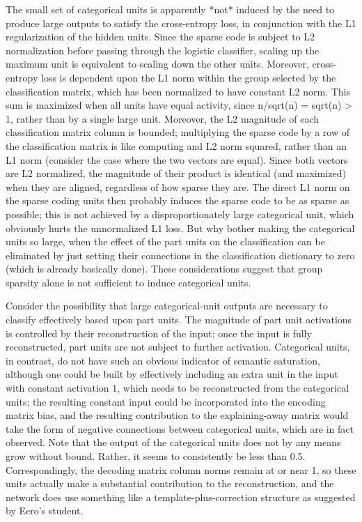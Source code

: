 The small set of categorical units is apparently *not* induced by the need to produce large outputs to satisfy the cross-entropy loss, in conjunction with the L1 regularization of the hidden units.  Since the sparse code is subject to L2 normalization before passing through the logistic classifier, scaling up the maximum unit is equivalent to scaling down the other units.  Moreover, cross-entropy loss is dependent upon the L1 norm within the group selected by the classification matrix, which has been normalized to have constant L2 norm.  This sum is maximized when all units have equal activity, since n/sqrt(n) = sqrt(n) > 1, rather than by a single large unit.  Moreover, the L2 magnitude of each classification matrix column is bounded; multiplying the sparse code by a row of the classification matrix is like computing and L2 norm squared, rather than an L1 norm (consider the case where the two vectors are equal).  Since both vectors are L2 normalized, the magnitude of their product is identical (and maximized) when they are aligned, regardless of how sparse they are.  The direct L1 norm on the sparse coding units then probably induces the sparse code to be as sparse as possible; this is not achieved by a disproportionately large categorical unit, which obviously hurts the unnormalized L1 loss.  But why bother making the categorical units so large, when the effect of the part units on the classification can be eliminated by just setting their connections in the classification dictionary to zero (which is already basically done).  These considerations suggest that group sparsity alone is not sufficient to induce categorical units.

Consider the possibility that large categorical-unit outputs are necessary to classify effectively based upon part units.  The magnitude of part unit activations is controlled by their reconstruction of the input; once the input is fully reconstructed, part units are not subject to further activation.  Categorical units, in contrast, do not have such an obvious indicator of semantic saturation, although one could be built by effectively including an extra unit in the input with constant activation 1, which needs to be reconstructed from the categorical units; the resulting constant input could be incorporated into the encoding matrix bias, and the resulting contribution to the explaining-away matrix would take the form of negative connections between categorical units, which are in fact observed.  Note that the output of the categorical units does not by any means grow without bound.  Rather, it seems to consistently be less than 0.5.  Correspondingly, the decoding matrix column norms remain at or near 1, so these units actually make a substantial contribution to the reconstruction, and the network does use something like a template-plus-correction structure as suggested by Eero's student.  

